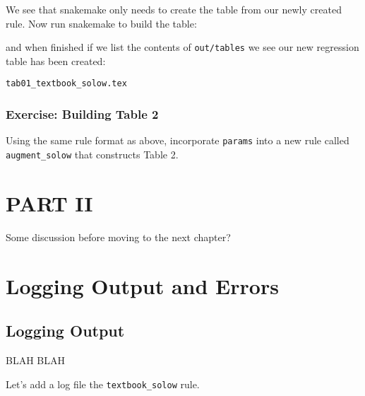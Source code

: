 \documentclass[]{book}
\newenvironment{Shaded}{\begin{snugshade}}{\end{snugshade}}
\newcommand{\KeywordTok}[1]{\textcolor[rgb]{0.13,0.29,0.53}{\textbf{{#1}}}}
\newcommand{\NormalTok}[1]{{#1}}
\theoremstyle{definition}
\theoremstyle{definition}
\theoremstyle{definition}
\theoremstyle{remark}
\begin{document}
We see that snakemake only needs to create the table from our newly
created rule. Now run snakemake to build the table:

\begin{Shaded}
\end{Shaded}

and when finished if we list the contents of \texttt{out/tables} we see
our new regression table has been created:

\begin{Shaded}
\end{Shaded}

\begin{verbatim}
tab01_textbook_solow.tex
\end{verbatim}

\subsection*{Exercise: Building Table
2}\label{exercise-building-table-2}

Using the same rule format as above, incorporate \texttt{params} into a
new rule called \texttt{augment\_solow} that constructs Table 2.

\chapter*{PART II}\label{part-ii}

Some discussion before moving to the next chapter?

\chapter{Logging Output and Errors}\label{logging-output-and-errors}

\section{Logging Output}\label{logging-output}

BLAH BLAH

Let's add a log file the \texttt{textbook\_solow} rule.
\end{document}
